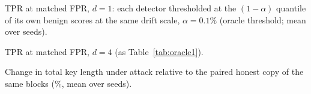 \documentclass[11pt,a4paper]{article}
\begin{document}
\begin{table}[h]
\centering
\caption{TPR at matched FPR, $d=1$: each detector thresholded at the $(1-\alpha)$ quantile of its own benign scores at the same drift scale, $\alpha=0.1\%$ (oracle threshold; mean over \nSeeds{} seeds).}\label{tab:oracle1}
\scriptsize\setlength{\tabcolsep}{2pt}\resizebox{\linewidth}{!}{}
\end{table}

\begin{table}[h]
\centering
\caption{TPR at matched FPR, $d=4$ (as Table~\ref{tab:oracle1}).}\label{tab:oracle4}
\scriptsize\setlength{\tabcolsep}{2pt}\resizebox{\linewidth}{!}{}
\end{table}

\begin{table}[h]
\centering
\caption{Change in total key length under attack relative to the paired honest copy of the same blocks (\%, mean over \nSeeds{} seeds).}\label{tab:pairedkey}
\footnotesize
\end{table}



\end{document}
